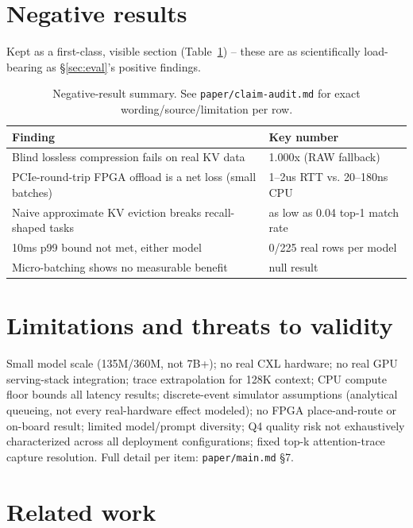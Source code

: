\documentclass[11pt]{article}
\begin{document}
\section{Negative results}
\label{sec:negative}

Kept as a first-class, visible section (Table~\ref{tab:negative}) --
these are as scientifically load-bearing as \S\ref{sec:eval}'s positive
findings.

\begin{table}[h]
\centering
\small
\begin{tabular}{@{}p{}p{}@{}}
\toprule
Finding & Key number \\
\midrule
Blind lossless compression fails on real KV data & 1.000x (RAW fallback) \\
PCIe-round-trip FPGA offload is a net loss (small batches) & 1--2us RTT vs. 20--180ns CPU \\
Naive approximate KV eviction breaks recall-shaped tasks & as low as 0.04 top-1 match rate \\
10ms p99 bound not met, either model & 0/225 real rows per model \\
Micro-batching shows no measurable benefit & null result \\
\bottomrule
\end{tabular}
\caption{Negative-result summary. See \texttt{paper/claim-audit.md} for exact wording/source/limitation per row.}
\label{tab:negative}
\end{table}

\section{Limitations and threats to validity}

Small model scale (135M/360M, not 7B+); no real CXL hardware; no real
GPU serving-stack integration; trace extrapolation for 128K context; CPU
compute floor bounds all latency results; discrete-event simulator
assumptions (analytical queueing, not every real-hardware effect
modeled); no FPGA place-and-route or on-board result; limited
model/prompt diversity; Q4 quality risk not exhaustively characterized
across all deployment configurations; fixed top-k attention-trace
capture resolution. Full detail per item: \texttt{paper/main.md} \S7.

\section{Related work}
\end{document}
